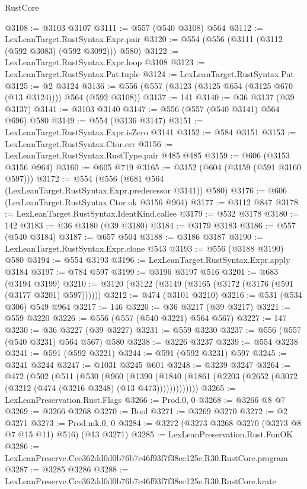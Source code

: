 \begin{lexlean}{RustCore}
\begin{coremodule}
@3108 := @3103 @3107
@3111 := @557 (@540 @3108) @564
@3112 := LexLeanTarget.RustSyntax.Expr.pair
@3120 := @554 (@556 (@3111 (@3112 (@592 @3083) (@592 @3092))) @580)
@3122 := LexLeanTarget.RustSyntax.Expr.loop @3108
@3123 := LexLeanTarget.RustSyntax.Pat.tuple
@3124 := LexLeanTarget.RustSyntax.Pat
@3125 := @2 @3124
@3136 := @556 (@557 (@3123 (@3125 @654 (@3125 @670 (@13 @3124)))) @564 (@592 @3108))
@3137 := 141
@3140 := @36 @3137 (@39 @3137)
@3141 := @3103 @3140
@3147 := @556 (@557 (@540 @3141) @564 @696) @580
@3149 := @554 (@3136 @3147)
@3151 := LexLeanTarget.RustSyntax.Expr.isZero @3141
@3152 := @584 @3151
@3153 := LexLeanTarget.RustSyntax.Ctor.err
@3156 := LexLeanTarget.RustSyntax.RustType.pair @485 @485
@3159 := @606 (@3153 @3156 @964)
@3160 := @605 @719
@3165 := @3152 (@604 (@3159 (@591 @3160 @597)))
@3172 := @554 (@556 (@681 @564 (LexLeanTarget.RustSyntax.Expr.predecessor @3141)) @580)
@3176 := @606 (LexLeanTarget.RustSyntax.Ctor.ok @3156 @964)
@3177 := @3112 @847
@3178 := LexLeanTarget.RustSyntax.IdentKind.callee
@3179 := @532 @3178
@3180 := 142
@3183 := @36 @3180 (@39 @3180)
@3184 := @3179 @3183
@3186 := @557 (@540 @3184)
@3187 := @657 @504
@3188 := @3186 @3187
@3190 := LexLeanTarget.RustSyntax.Expr.clone @543
@3193 := @556 (@3188 @3190) @580
@3194 := @554 @3193
@3196 := LexLeanTarget.RustSyntax.Expr.apply @3184
@3197 := @784 @597
@3199 := @3196 @3197 @516
@3201 := @683 (@3194 @3199)
@3210 := @3120 (@3122 (@3149 (@3165 (@3172 (@3176 (@591 (@3177 @3201) @597))))))
@3212 := @474 (@3101 @3210)
@3216 := @531 (@534 @306) @549 @964
@3217 := 146
@3220 := @36 @3217 (@39 @3217)
@3221 := @559 @3220
@3226 := @556 (@557 (@540 @3221) @564 @567)
@3227 := 147
@3230 := @36 @3227 (@39 @3227)
@3231 := @559 @3230
@3237 := @556 (@557 (@540 @3231) @564 @567) @580
@3238 := @3226 @3237
@3239 := @554 @3238
@3241 := @591 (@592 @3221)
@3244 := @591 (@592 @3231) @597
@3245 := @3241 @3244
@3247 := @1031 @3245 @601
@3248 := @3239 @3247
@3264 := @472
    (@502
      (@511
        (@530
          (@960
            (@1390
              (@1840 (@1861 (@2203 (@2652 (@3072 (@3212 (@474 (@3216 @3248) (@13 @473)))))))))))))
@3265 := LexLeanPreservation.Rust.Flags
@3266 := Prod.{0, 0}
@3268 := @3266 @8 @7
@3269 := @3266 @3268
@3270 := Bool
@3271 := @3269 @3270
@3272 := @2 @3271
@3273 := Prod.mk.{0, 0}
@3284 := @3272 (@3273 @3268 @3270 (@3273 @8 @7 @15 @11) @516) (@13 @3271)
@3285 := LexLeanPreservation.Rust.FunOK
@3286 := LexLeanPreserve.Ccc362dd0d0b76b7c46f93f7f38ec125e.R30.RustCore.program
@3287 := @3285 @3286
@3288 := LexLeanPreserve.Ccc362dd0d0b76b7c46f93f7f38ec125e.R30.RustCore.krate

\end{coremodule}
\end{lexlean}
